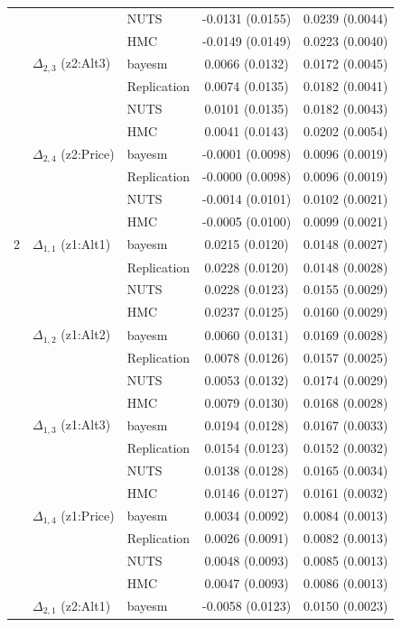 \begin{longtable}{cllcc}
 &  & NUTS & -0.0131 (0.0155) & 0.0239 (0.0044) \\
 &  & HMC & -0.0149 (0.0149) & 0.0223 (0.0040) \\
 & $\Delta_{2,3}$ (z2:Alt3) & bayesm & 0.0066 (0.0132) & 0.0172 (0.0045) \\
 &  & Replication & 0.0074 (0.0135) & 0.0182 (0.0041) \\
 &  & NUTS & 0.0101 (0.0135) & 0.0182 (0.0043) \\
 &  & HMC & 0.0041 (0.0143) & 0.0202 (0.0054) \\
 & $\Delta_{2,4}$ (z2:Price) & bayesm & -0.0001 (0.0098) & 0.0096 (0.0019) \\
 &  & Replication & -0.0000 (0.0098) & 0.0096 (0.0019) \\
 &  & NUTS & -0.0014 (0.0101) & 0.0102 (0.0021) \\
 &  & HMC & -0.0005 (0.0100) & 0.0099 (0.0021) \\
2 & $\Delta_{1,1}$ (z1:Alt1) & bayesm & 0.0215 (0.0120) & 0.0148 (0.0027) \\
 &  & Replication & 0.0228 (0.0120) & 0.0148 (0.0028) \\
 &  & NUTS & 0.0228 (0.0123) & 0.0155 (0.0029) \\
 &  & HMC & 0.0237 (0.0125) & 0.0160 (0.0029) \\
 & $\Delta_{1,2}$ (z1:Alt2) & bayesm & 0.0060 (0.0131) & 0.0169 (0.0028) \\
 &  & Replication & 0.0078 (0.0126) & 0.0157 (0.0025) \\
 &  & NUTS & 0.0053 (0.0132) & 0.0174 (0.0029) \\
 &  & HMC & 0.0079 (0.0130) & 0.0168 (0.0028) \\
 & $\Delta_{1,3}$ (z1:Alt3) & bayesm & 0.0194 (0.0128) & 0.0167 (0.0033) \\
 &  & Replication & 0.0154 (0.0123) & 0.0152 (0.0032) \\
 &  & NUTS & 0.0138 (0.0128) & 0.0165 (0.0034) \\
 &  & HMC & 0.0146 (0.0127) & 0.0161 (0.0032) \\
 & $\Delta_{1,4}$ (z1:Price) & bayesm & 0.0034 (0.0092) & 0.0084 (0.0013) \\
 &  & Replication & 0.0026 (0.0091) & 0.0082 (0.0013) \\
 &  & NUTS & 0.0048 (0.0093) & 0.0085 (0.0013) \\
 &  & HMC & 0.0047 (0.0093) & 0.0086 (0.0013) \\
 & $\Delta_{2,1}$ (z2:Alt1) & bayesm & -0.0058 (0.0123) & 0.0150 (0.0023) \\

\end{longtable}
